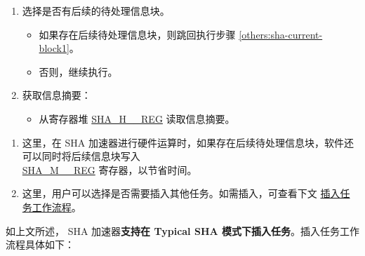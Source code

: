 \documentclass[main\_\_CN.tex]{subfiles}
\begin{document}
\begin{enumerate}
    \item 选择是否有后续的待处理信息块。
    \begin{itemize}
        \item 如果存在后续待处理信息块，则跳回执行步骤 \ref{others:sha-current-block1}。
        \item 否则，继续执行。
    \end{itemize}
    
    \item 获取信息摘要：
    \begin{itemize}
        \item 从寄存器堆 \hyperref[regdesc:SHAHNREG]{SHA\_H\_\_REG} 读取信息摘要。
    \end{itemize}
\end{enumerate}

\begin{tiplisting}\label{others:sha-note-typical-sha}
\vspace{-2.5em}
\begin{enumerate}
\item 这里，在 SHA 加速器进行硬件运算时，如果存在后续待处理信息块，软件还可以同时将后续信息块写入 \\ \hyperref[regdesc:SHAMNREG]{SHA\_M\_\_REG} 寄存器，以节省时间。
\item 这里，用户可以选择是否需要插入其他任务。如需插入，可查看下文 \hyperref[others:sha-interleaved]{插入任务工作流程}。
\end{enumerate}
\end{tiplisting}


\label{others:sha-interleaved}
如上文所述，\chipname{} SHA 加速器\textbf{支持在 Typical SHA 模式下插入任务}。插入任务工作流程具体如下：
\end{document}
